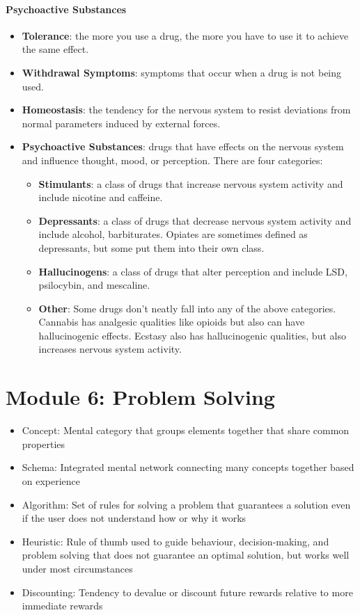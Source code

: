 \documentclass[10pt,letter]{article}
\theoremstyle{plain}
\theoremstyle{definition}
\begin{document}
\paragraph{Psychoactive Substances}
\begin{itemize}
    \item \textbf{Tolerance}: the more you use a drug, the more you have to use it to achieve the same effect. 
    \item \textbf{Withdrawal Symptoms}: symptoms that occur when a drug is not being used.
    \item \textbf{Homeostasis}: the tendency for the nervous system to resist deviations from normal parameters induced by external forces.
    \item \textbf{Psychoactive Substances}: drugs that have effects on the nervous system and influence thought, mood, or perception. There are four categories: 
    \begin{itemize}
        \item \textbf{Stimulants}: a class of drugs that increase nervous system activity and include nicotine and caffeine. 
        \item \textbf{Depressants}: a class of drugs that decrease nervous system activity and include alcohol, barbiturates. Opiates are sometimes defined as depressants, but some put them into their own class. 
        \item \textbf{Hallucinogens}: a class of drugs that alter perception and include LSD, psilocybin, and mescaline. 
        \item \textbf{Other}: Some drugs don't neatly fall into any of the above categories. Cannabis has analgesic qualities like opioids but also can have hallucinogenic effects. Ecstasy also has hallucinogenic qualities, but also increases nervous system activity.
    \end{itemize}
\end{itemize}


\section*{Module 6: Problem Solving}
\begin{itemize}
    \item Concept: Mental category that groups elements together that share common properties
    \item Schema: Integrated mental network connecting many concepts together based on experience
    \item Algorithm: Set of rules for solving a problem that guarantees a solution even if the user does not understand how or why it works
    \item Heuristic: Rule of thumb used to guide behaviour, decision-making, and problem solving that does not guarantee an optimal solution, but works well under most circumstances
    \item Discounting: Tendency to devalue or discount future rewards relative to more immediate rewards
\end{itemize}
\end{document}
